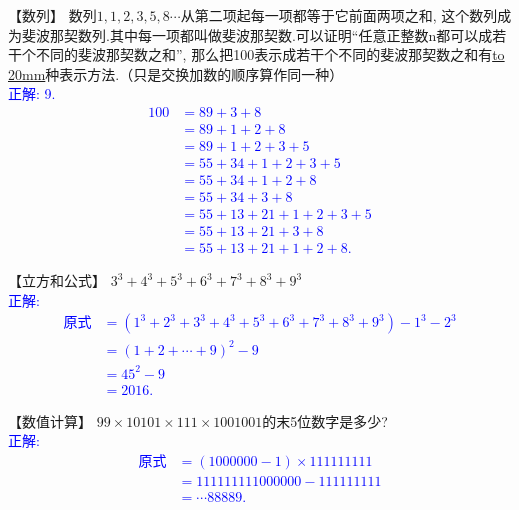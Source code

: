 \item {
    【数列】
    数列$1, 1,2,3,5,8\cdots$从第二项起每一项都等于它前面两项之和, 这个数列成为斐波那契数列.其中每一项都叫做斐波那契数.可以证明``任意正整数n都可以成若干个不同的斐波那契数之和'', 那么把100表示成若干个不同的斐波那契数之和有\underline{\hbox to 20mm{}}种表示方法.（只是交换加数的顺序算作同一种）
    \ifshowSolution
        \\\fangsong{}\textcolor{blue}{
            正解: 9.
            \begin{align}
                100&=89+3+8\\
                &=89+1+2+8\\
                &=89+1+2+3+5\\
                &=55+34+1+2+3+5\\
                &=55+34+1+2+8\\
                &=55+34+3+8\\
                &=55+13+21+1+2+3+5\\
                &=55+13+21+3+8\\
                &=55+13+21+1+2+8.
            \end{align}
        }
    \else
        \vspace{1cm}
    \fi 
}

\item {
    【立方和公式】
    $3^3 + 4^3 + 5^3 + 6^3 + 7^3 + 8^3 + 9^3$
    \ifshowSolution
        \\\fangsong{}\textcolor{blue}{
            正解:
            \begin{align*}
                \mbox{原式} &= (1^3 + 2^3 + 3^3 + 4^3 + 5^3 + 6^3 + 7^3 + 8^3 + 9^3) - 1^3 - 2^3 \\
                &= (1 + 2 +\cdots + 9)^2 - 9 \\
                &= 45^2 - 9 \\
                &= 2016.
            \end{align*}
        }
    \else
        \vspace{1cm}
    \fi
}

\item {
    【数值计算】
    $99\times 10101\times 111\times 1001001$的末5位数字是多少?
    \ifshowSolution
        \\\fangsong{}\textcolor{blue}{
            正解:
            \begin{align*}
                \mbox{原式} &= (1000000-1)\times 111111111 \\
                &= 111111111000000- 111111111 \\
                &= \cdots 88889.
            \end{align*}
        }
    \else
        \vspace{1cm}
    \fi
}

